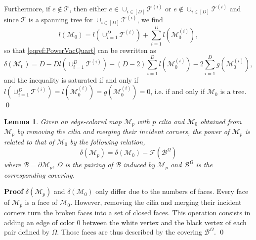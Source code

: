 \documentclass[aps,prd,10pt,notitlepage,nofootinbib,superscriptaddress,showkeys,showpacs]{revtex4-1}
\newtheorem{lemma}{Lemma}
\begin{document}
Furthermore, if $e\not\in{\mathcal{T}}$, then either $e\in \cup_{i\in[D]} {\mathcal{T}}^{(i)}$ or $e\not\in\cup_{i\in[D]} {\mathcal{T}}^{(i)}$ and since ${\mathcal{T}}$ is a spanning tree for $\cup_{i\in[D]}{\mathcal{T}}^{(i)}$, we find
\begin{equation}
l({\mathcal{M}}_0)=l(\cup_{i=1}^D{\mathcal{T}}^{(i)})+\sum_{i=1}^Dl({\mathcal{M}}_0^{(i)}),
\end{equation}
so that \eqref{eqref:PowerVacQuart} can be rewritten as 
\begin{equation}
\delta({\mathcal{M}}_0)=D-Dl(\cup_{i=1}^D{\mathcal{T}}^{(i)})-(D-2)\sum_{i=1}^Dl({\mathcal{M}}_0^{(i)})-2\sum_{i=1}^Dg({\mathcal{M}}_0^{(i)}),
\end{equation}
and the inequality is saturated if and only if $l(\cup_{i=1}^D{\mathcal{T}}^{(i)})=l({\mathcal{M}}_0^{(i)})=g({\mathcal{M}}_0^{(i)})=0$, i.e. if and only if ${\mathcal{M}}_0$ is a tree.
\qed
 
\begin{lemma}
\label{lemma:VacVersusExt}
Given an edge-colored map ${\mathcal{M}}_p$ with $p$ cilia and ${\mathcal{M}}_0$ obtained from ${\mathcal{M}}_p$ by removing the cilia and merging their incident corners, the power of ${\mathcal{M}}_p$ is related to that of ${\mathcal{M}}_0$ by the following relation,
\begin{equation}
\delta({\mathcal{M}}_p)=\delta({\mathcal{M}}_0)-{\mathcal{F}}({\mathcal{B}}^\Omega)
\end{equation}
where ${\mathcal{B}} = \partial {\mathcal{M}}_p$, $\Omega$ is the pairing of ${\mathcal{B}}$ induced by ${\mathcal{M}}_p$ and ${\mathcal{B}}^\Omega$ is the corresponding covering.
\end{lemma}

{{\noindent \bf Proof\; \; }} $\delta({\mathcal{M}}_p)$ and $\delta({\mathcal{M}}_0)$ only differ due to the numbers of faces. Every face of ${\mathcal{M}}_p$ is a face of ${\mathcal{M}}_0$. However, removing the cilia and merging their incident corners turn the broken faces into a set of closed faces. This operation consists in adding an edge of color $0$ between the white vertex and the black vertex of each pair defined by $\Omega$. Those faces are thus described by the covering ${\mathcal{B}}^{\Omega}$.
\qed
 
\end{document}
